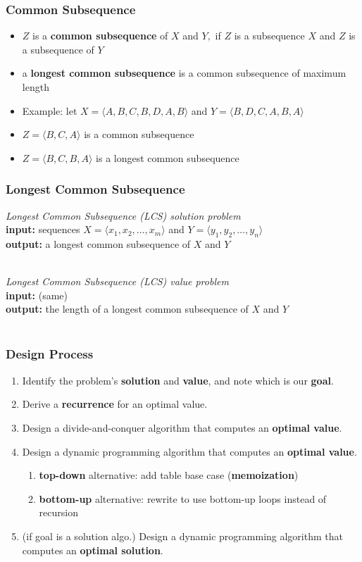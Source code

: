 \documentclass[10pt,aspectratio=169]{beamer}
\newcommand{\stanza}{ \\~\ }
\begin{document}
\begin{frame} \frametitle{Common Subsequence}
  \begin{itemize}
  \item $Z$ is a \textbf{common subsequence} of $X$ and $Y,$ if $Z$ is a subsequence $X$ and $Z$ is a subsequence of $Y$
  \item a \textbf{longest common subsequence} is a common subsequence of maximum length
  \item Example: let $X=\langle A, B, C, B, D, A, B \rangle $  and $Y=\langle B, D, C, A, B, A \rangle$ 
  \item $Z=\langle B, C, A \rangle$ is a common subsequence
  \item $Z=\langle B, C, B, A \rangle$ is a longest common subsequence
  \end{itemize}
\end{frame}

\begin{frame} \frametitle{Longest Common Subsequence}

  \emph{Longest Common Subsequence (LCS) solution problem} \\
  \textbf{input:} sequences $X=\langle x_1, x_2, \ldots, x_m \rangle$ and $Y=\langle y_1, y_2, \ldots, y_n \rangle$ \\
  \textbf{output:} a longest common subsequence of $X$ and $Y$ \stanza
  
  \emph{Longest Common Subsequence (LCS) value problem} \\
  \textbf{input:} (same) \\
  \textbf{output:} the length of a longest common subsequence of $X$ and $Y$ \stanza

\end{frame}

\begin{frame} \frametitle{Design Process}
  \begin{enumerate}
    \item Identify the problem's \textbf{solution} and \textbf{value}, and note which is our \textbf{goal}.
    \item Derive a \textbf{recurrence} for an optimal value.
    \item Design a divide-and-conquer algorithm that computes an \textbf{optimal value}.
    \item Design a dynamic programming algorithm that computes an \textbf{optimal value}.
    \begin{enumerate}
      \item \textbf{top-down} alternative: add table base case (\textbf{memoization})
      \item \textbf{bottom-up} alternative: rewrite to use bottom-up loops instead of recursion
    \end{enumerate}
    \item (if goal is a solution algo.) Design a dynamic programming algorithm that computes an \textbf{optimal solution}.
  \end{enumerate}
  \end{frame}
\end{document}
